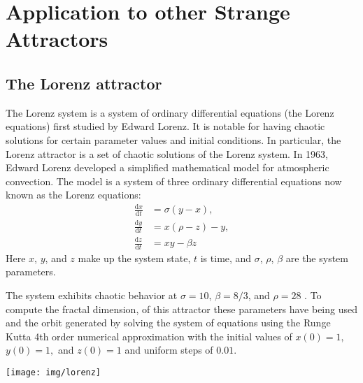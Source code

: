 \section{Application to other Strange Attractors}
\subsection{The Lorenz attractor }
The Lorenz system is a system of ordinary differential equations (the Lorenz equations) first studied by Edward Lorenz. It is notable for having chaotic solutions for certain parameter values and initial conditions. In particular, the Lorenz attractor is a set of chaotic solutions of the Lorenz system.
In 1963, Edward Lorenz developed a simplified mathematical model for atmospheric convection. The model is a system of three ordinary differential equations now known as the Lorenz equations:
\begin{subequations}
\begin{align}
\frac{\mathrm{d}x}{\mathrm{d}t} &= \sigma(y-x),  \\
\frac{\mathrm{d}y}{\mathrm{d}t} &= x(\rho -z) - y,\\
\frac{\mathrm{d}z}{\mathrm{d}t} &= xy-\beta z
\end{align}
\end{subequations}
Here $x$, $y$, and $z$ make up the system state, $t$ is time, and $\sigma$, $\rho$, $\beta$ are the system parameters.

The system exhibits chaotic behavior at $ \sigma = 10$, $\beta = 8/3$, and $\rho = 28$ . To compute the fractal dimension, of this attractor these parameters have being used and the orbit generated by solving the system of equations using the Runge Kutta 4th order numerical approximation with the initial values of $x(0) = 1,$ $y(0) = 1,$ and $z(0)=1$ and uniform steps of $0.01$.  


\begin{center}
  \texttt{[image: img/lorenz]}
	\label{lorenzatt:fig}
\end{center}


